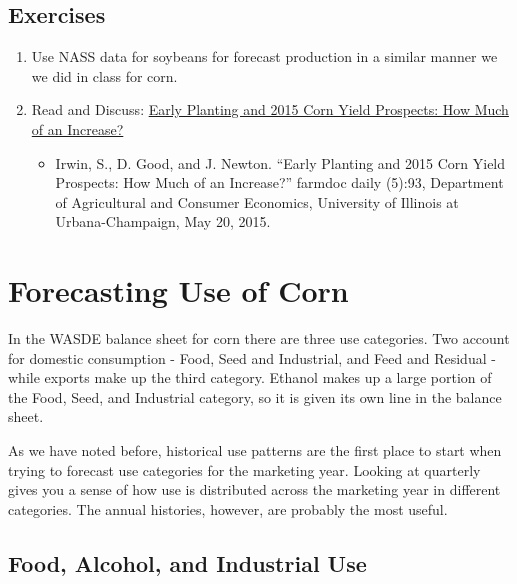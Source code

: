 \documentclass[
]{book}
\providecommand{\tightlist}{%
  \setlength{\itemsep}{0pt}\setlength{\parskip}{0pt}}
\begin{document}
\hypertarget{exercises-3}{%
\section{Exercises}\label{exercises-3}}

\begin{enumerate}
\def\labelenumi{\arabic{enumi}.}
\item
  Use NASS data for soybeans for forecast production in a similar manner we we did in class for corn.
\item
  Read and Discuss: \href{http://farmdocdaily.illinois.edu/2015/05/early-planting-and-2015-corn-yield-prospects.html}{Early Planting and 2015 Corn Yield Prospects: How Much of an Increase?}

  \begin{itemize}
  \tightlist
  \item
    Irwin, S., D. Good, and J. Newton. ``Early Planting and 2015 Corn Yield Prospects: How Much of an Increase?'' farmdoc daily (5):93, Department of Agricultural and Consumer Economics, University of Illinois at Urbana-Champaign, May 20, 2015.
  \end{itemize}
\end{enumerate}

\hypertarget{forecasting-use-of-corn}{%
\chapter{Forecasting Use of Corn}\label{forecasting-use-of-corn}}

In the WASDE balance sheet for corn there are three use categories. Two account for domestic consumption - Food, Seed and Industrial, and Feed and Residual - while exports make up the third category. Ethanol makes up a large portion of the Food, Seed, and Industrial category, so it is given its own line in the balance sheet.

As we have noted before, historical use patterns are the first place to start when trying to forecast use categories for the marketing year. Looking at quarterly gives you a sense of how use is distributed across the marketing year in different categories. The annual histories, however, are probably the most useful.

\hypertarget{food-alcohol-and-industrial-use}{%
\section{Food, Alcohol, and Industrial Use}\label{food-alcohol-and-industrial-use}}
\end{document}
